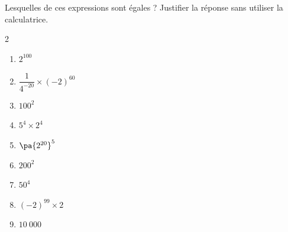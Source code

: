\begin{exo}{}
	Lesquelles de ces expressions sont égales ? Justifier la réponse sans utiliser la calculatrice.
	\vspace*{-2mm}\begin{multicols}{2}
		\begin{enumerate}[itemsep=2mm]
			\item $2^{100}$
			\item $\dfrac{1}{4^{-20}} \times (-2)^{60}$
			\item $100^2$
			\item $5^4 \times 2^4$
			\item $\pa{2^{20}}^5$
			\item $200^2$
			\item $50^4$
			\item $(-2)^{99} \times 2$
			\item $10\ 000$
		\end{enumerate}
	\end{multicols}
\end{exo}

